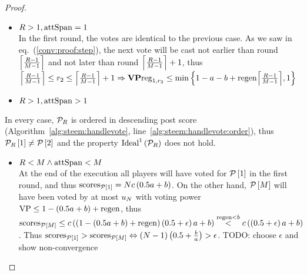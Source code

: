 \begin{proof}
\begin{itemize}
\begin{itemize}
      \item $\rounds > 1, \attspan = 1$ \\
      In the first round, the votes are identical to the previous case. As we
      saw in eq.~(\ref{conv:proof:step}), the next vote will be cast not earlier
      than round $\ceil*{\frac{\rounds - 1}{\postlen - 1}}$ and not later than
      round $\ceil*{\frac{\rounds - 1}{\postlen - 1}} + 1$, thus
      $\ceil*{\frac{\rounds - 1}{\postlen - 1}} \leq \round_2 \leq
      \ceil*{\frac{\rounds - 1}{\postlen - 1}} + 1 \Rightarrow \votpowvecreg_{1,
      \round_2} \leq \min{\left\{1 - a - b + \regen\ceil*{\frac{\rounds -
      1}{\postlen - 1}}, 1\right\}}$

      \item $\rounds > 1, \attspan > 1$ \\
    \end{itemize}
    In every case, $\postlist_\rounds$ is ordered in descending post score
    (Algorithm~\ref{alg:steem:handlevote},
    line~\ref{alg:steem:handlevote:order}), thus
    $\postlist_\rounds\left[1\right] \neq \postlist\left[2\right]$ and the
    property $\mathrm{Ideal}^1\left(\postlist_\rounds\right)$ does not hold.
      \begin{itemize}
      \item $\rounds < \postlen \wedge \attspan < \postlen$ \\
      At the end of the execution all players will have voted for
      $\postlist\left[1\right]$ in the first round, and thus
      $\mathrm{scores}_{\postlist\left[1\right]} = \playerlen c \left(0.5a +
      b\right)$. On the other hand, $\postlist\left[\postlen\right]$ will have
      been voted by at most $u_\playerlen$ with voting power $\votpow \leq 1 -
      \left(0.5a + b\right) + \regen$, thus \\
      $\mathrm{scores}_{\postlist\left[\postlen\right]} \leq c \left(\left(1 -
      \left(0.5a + b\right) + \regen\right)\left(0.5 + \epsilon\right)a +
      b\right) \overset{\regen < b}{<} c\left(\left(0.5 + \epsilon\right)a +
      b\right)$. Thus $\mathrm{scores}_{\postlist\left[1\right]} >
      \mathrm{scores}_{\postlist\left[\postlen\right]} \Leftrightarrow \left(N
      - 1\right)\left(0.5 + \frac{b}{a}\right) > \epsilon$. TODO: choose
      $\epsilon$ and show non-convergence


\end{itemize}
\end{itemize}
\end{proof}
